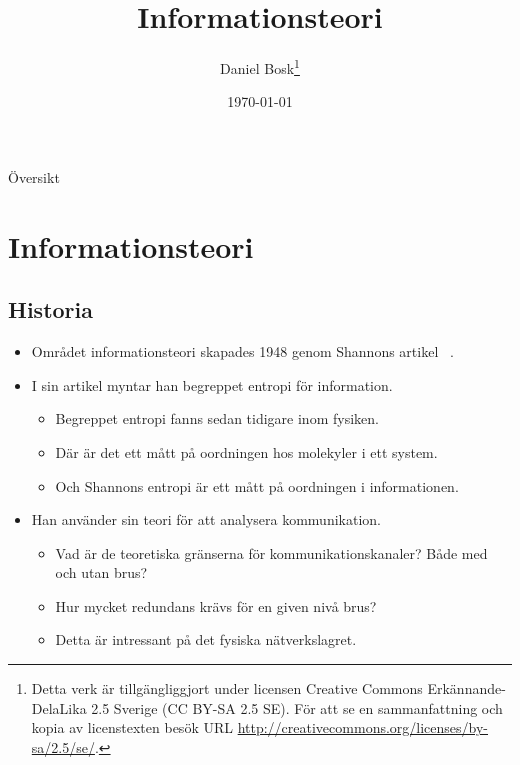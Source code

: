 \documentclass{beamer}
\title{%
  Informationsteori
}
\author{Daniel Bosk\footnote{%
  Detta verk är tillgängliggjort under licensen Creative Commons 
  Erkännande-DelaLika 2.5 Sverige (CC BY-SA 2.5 SE).
	För att se en sammanfattning och kopia av licenstexten besök URL 
	\url{http://creativecommons.org/licenses/by-sa/2.5/se/}.
}}
\institute[MIUN IKS]{%
  Avdelningen för informations- och kommunikationssytem (IKS),\\
  Mittuniversitetet, Sundsvall.
}
\date{\today}
\theoremstyle{definition}
\begin{document}
\begin{frame}
  \titlepage{}
\end{frame}

\begin{frame}{Översikt}
  \tableofcontents
\end{frame}





\section{Informationsteori}

\subsection{Historia}

\begin{frame}{\insertsubsectionhead}
  \begin{itemize}
    \item Området informationsteori skapades 1948 genom Shannons artikel 
      ~\cite{Shannon1948amt}.

    \item I sin artikel myntar han begreppet entropi för information.
      \begin{itemize}
        \item Begreppet entropi fanns sedan tidigare inom fysiken.
        \item Där är det ett mått på oordningen hos molekyler i ett system.
        \item Och Shannons entropi är ett mått på oordningen i informationen.
      \end{itemize}

    \item Han använder sin teori för att analysera kommunikation.
      \begin{itemize}
        \item Vad är de teoretiska gränserna för kommunikationskanaler?
          Både med och utan brus?
        \item Hur mycket redundans krävs för en given nivå brus?
        \item Detta är intressant på det fysiska nätverkslagret.
      \end{itemize}

  \end{itemize}
\end{frame}
\end{document}
